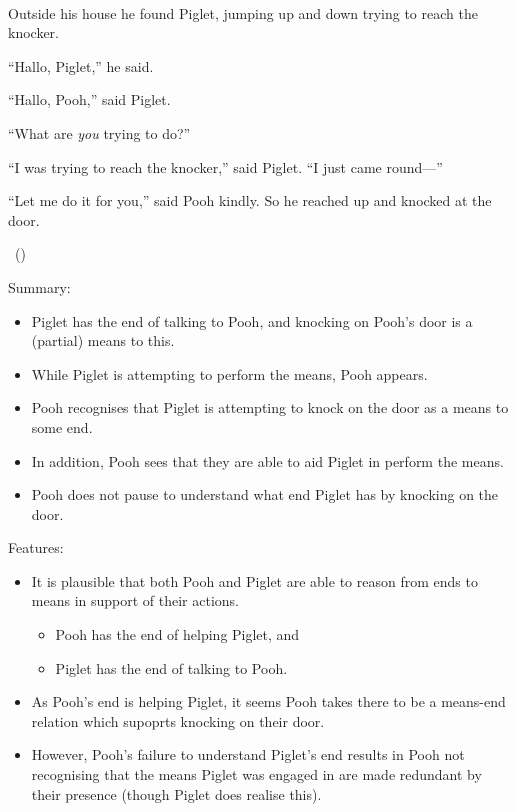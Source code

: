 \documentclass[10pt]{article}
\begin{document}
\begin{scenario}\mbox{ }

  Outside his house he found Piglet, jumping up and down trying to reach the knocker.

  ``Hallo, Piglet,'' he said.

  ``Hallo, Pooh,'' said Piglet.

  ``What are \emph{you} trying to do?''

  ``I was trying to reach the knocker,'' said Piglet. ``I just came round---''

  ``Let me do it for you,'' said Pooh kindly.
  So he reached up and knocked at the door.
  
  \mbox{ }\hfill\mbox{(\cite[77--78]{Milne:2009aa})}
\end{scenario}

Summary:
\begin{itemize}
\item Piglet has the end of talking to Pooh, and knocking on Pooh's door is a (partial) means to this.
\item While Piglet is attempting to perform the means, Pooh appears.
\item Pooh recognises that Piglet is attempting to knock on the door as a means to some end.
\item In addition, Pooh sees that they are able to aid Piglet in perform the means.
\item Pooh does not pause to understand what end Piglet has by knocking on the door.
\end{itemize}

Features:
\begin{itemize}
\item It is plausible that both Pooh and Piglet are able to reason from ends to means in support of their actions.
  \begin{itemize}
  \item Pooh has the end of helping Piglet, and
  \item Piglet has the end of talking to Pooh.
  \end{itemize}
\item As Pooh's end is helping Piglet, it seems Pooh takes there to be a means-end relation which supoprts knocking on their door.
\item However, Pooh's failure to understand Piglet's end results in Pooh not recognising that the means Piglet was engaged in are made redundant by their presence (though Piglet does realise this).

\end{itemize}
\end{document}
